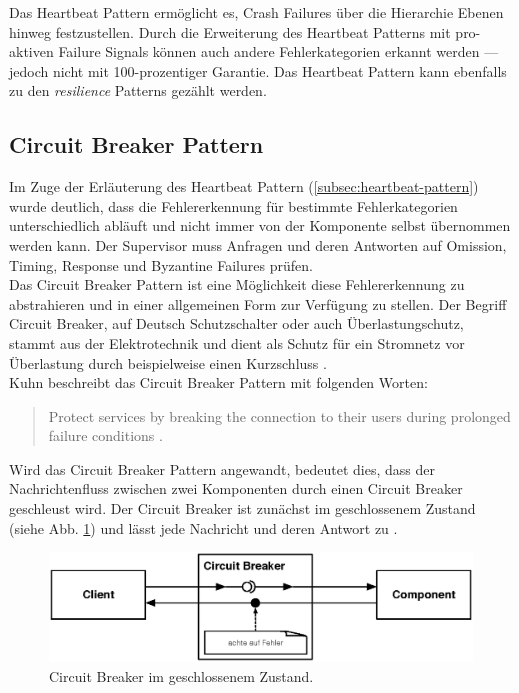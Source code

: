 Das Heartbeat Pattern ermöglicht es, Crash Failures über die Hierarchie Ebenen hinweg festzustellen. Durch die Erweiterung des Heartbeat Patterns mit pro-aktiven Failure Signals können auch andere Fehlerkategorien erkannt werden --- jedoch nicht mit 100-prozentiger Garantie. Das Heartbeat Pattern kann ebenfalls zu den \textit{resilience} Patterns gezählt werden. 

\pagebreak

\subsection{Circuit Breaker Pattern}\label{subsec:circuit-breaker-pattern}
Im Zuge der Erläuterung des Heartbeat Pattern (\ref{subsec:heartbeat-pattern}) wurde deutlich, dass die Fehlererkennung für bestimmte Fehlerkategorien unterschiedlich abläuft und nicht immer von der Komponente selbst übernommen werden kann. Der Supervisor muss Anfragen und deren Antworten auf Omission, Timing, Response und Byzantine Failures prüfen.\\
Das Circuit Breaker Pattern ist eine Möglichkeit diese Fehlererkennung zu abstrahieren und in einer allgemeinen Form zur Verfügung zu stellen. Der Begriff Circuit Breaker, auf Deutsch Schutzschalter oder auch Überlastungschutz, stammt aus der Elektrotechnik und dient als Schutz für ein Stromnetz vor Überlastung durch beispielweise einen Kurzschluss \cite[S.~93]{nygard_release_2007}.\\
Kuhn beschreibt das Circuit Breaker Pattern mit folgenden Worten:

\begin{quotation}
Protect services by breaking the connection to their users during prolonged failure conditions \cite[S.~202]{kuhn_reactive_2015}.
\end{quotation}

Wird das Circuit Breaker Pattern angewandt, bedeutet dies, dass der Nachrichtenfluss zwischen zwei Komponenten durch einen Circuit Breaker geschleust wird. Der Circuit Breaker ist zunächst im geschlossenem Zustand (siehe Abb. \ref{fig:circuit-breaker-closed}) und lässt jede Nachricht und deren Antwort zu \cite[S.~93]{nygard_release_2007}.

\begin{figure}[H]
 \centering
 \includegraphics[width=1.0\textwidth]{4-Hauptteil/circuit-breaker/circuit-breaker-closed.eps}
 \caption{Circuit Breaker im geschlossenem Zustand.}
 \label{fig:circuit-breaker-closed}
\end{figure}

